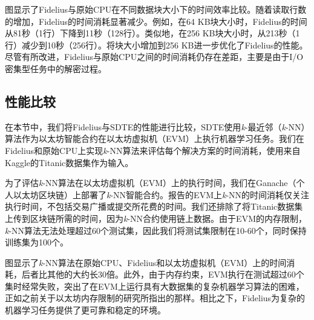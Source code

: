 图显示了Fidelius与原始CPU在不同数据块大小下的时间效率比较。随着读取行数的增加，Fidelius的时间消耗显著减少。例如，在64 KB块大小时，Fidelius的时间从81秒（1行）下降到11秒（128行）。类似地，在256 KB块大小时，从213秒（1行）减少到10秒（256行）。将块大小增加到256 KB进一步优化了Fidelius的性能。尽管有所改进，Fidelius与原始CPU之间的时间消耗仍存在差距，主要是由于I/O密集型任务中的解密过程。

\subsection{性能比较}
在本节中，我们将Fidelius与SDTE的性能进行比较，SDTE使用\textit{k}-最近邻（\textit{k}-NN）算法作为以太坊智能合约在以太坊虚拟机（EVM）上执行机器学习任务。我们在Fidelius和原始CPU上实现\textit{k}-NN算法来评估每个解决方案的时间消耗，使用来自Kaggle的Titanic数据集作为输入。

为了评估\textit{k}-NN算法在以太坊虚拟机（EVM）上的执行时间，我们在Ganache（个人以太坊区块链）上部署了\textit{k}-NN智能合约。报告的EVM上\textit{k}-NN的时间消耗仅关注执行时间，不包括交易广播或提交所花费的时间。我们还排除了将Titanic数据集上传到区块链所需的时间，因为\textit{k}-NN合约使用链上数据。由于EVM的内存限制，\textit{k}-NN算法无法处理超过60个测试集，因此我们将测试集限制在10-60个，同时保持训练集为100个。

图显示了\textit{k}-NN算法在原始CPU、Fidelius和以太坊虚拟机（EVM）上的时间消耗，后者比其他的大约长30倍。此外，由于内存约束，EVM执行在测试超过60个集时经常失败，突出了在EVM上运行具有大数据集的复杂机器学习算法的困难，正如之前关于以太坊内存限制的研究所指出的那样。相比之下，Fidelius为复杂的机器学习任务提供了更可靠和稳定的环境。 